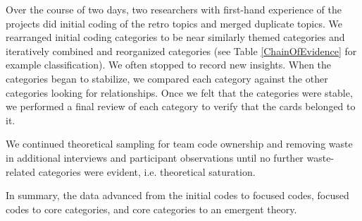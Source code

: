 Over the course of two days, two researchers with first-hand experience of the projects did initial coding of the retro topics and merged duplicate topics. We rearranged initial coding categories to be near similarly themed categories and iteratively combined and reorganized categories (see Table \ref{ChainOfEvidence} for example classification). We often stopped to record new insights. When the categories began to stabilize, we compared each category against the other categories looking for relationships. Once we felt that the categories were stable, we performed a final review of each category to verify that the cards belonged to it. 


We continued theoretical sampling for team code ownership and removing waste in additional interviews and participant observations until no further waste-related categories were evident, i.e. theoretical saturation. 


In summary, the data advanced from the initial codes to focused codes, focused codes to core categories, and core categories to an emergent theory. 








